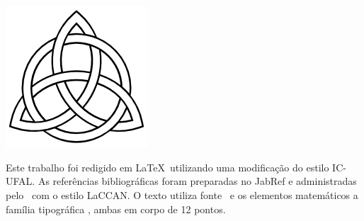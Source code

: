 \documentclass[tcc]{ic}
\begin{document}
\chapter*{}
\vfill
\singlespacing
\thispagestyle{empty}
\begin{center}
\includegraphics[width=.3\textwidth]{./capitulos/figs/knot}

\vspace{.5cm}

Este trabalho foi redigido em {\large \LaTeX}\ utilizando uma modificação do estilo \textsf{IC-UFAL}.
As referências bibliográficas foram preparadas no \textsf{JabRef} e administradas pelo {\large\BibTeX}\ com o estilo \textsf{LaCCAN}.
O texto utiliza fonte \NomeFonte\ e os elementos matemáticos a família tipográfica \NomeFonteMat, ambas em corpo de 12 pontos.
\vspace{.5cm}
\end{center}
\end{document}
